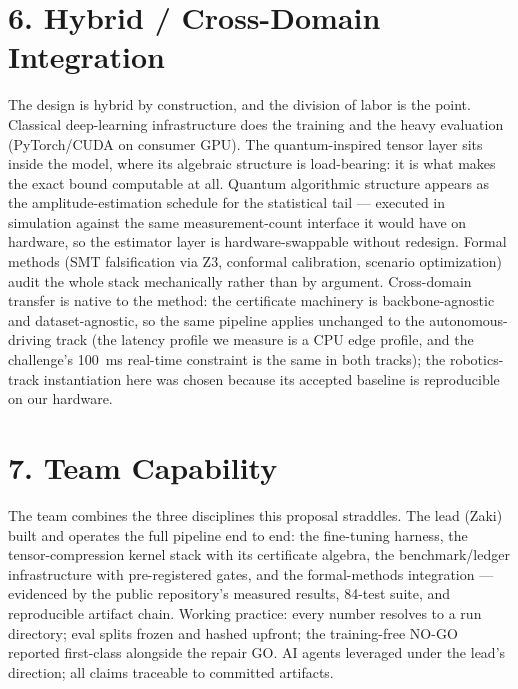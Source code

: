 \documentclass[10pt]{article}
\begin{document}
\section*{6. Hybrid / Cross-Domain Integration}
The design is hybrid by construction, and the division of labor is the point.
Classical deep-learning infrastructure does the training and the heavy
evaluation (PyTorch/CUDA on consumer GPU). The quantum-inspired tensor layer
sits inside the model, where its algebraic structure is load-bearing: it is
what makes the exact bound computable at all. Quantum algorithmic structure
appears as the amplitude-estimation schedule for the statistical tail ---
executed in simulation against the same measurement-count interface it would
have on hardware, so the estimator layer is hardware-swappable without
redesign. Formal methods (SMT falsification via Z3, conformal calibration,
scenario optimization) audit the whole stack mechanically rather than by
argument. Cross-domain transfer is native to the method: the certificate
machinery is backbone-agnostic and dataset-agnostic, so the same pipeline
applies unchanged to the autonomous-driving track (the latency profile we
measure is a CPU edge profile, and the challenge's 100~ms real-time constraint
is the same in both tracks); the robotics-track instantiation here was chosen
because its accepted baseline is reproducible on our hardware.

\section*{7. Team Capability}
The team combines the three disciplines this proposal straddles.
The lead (Zaki) built and operates the full pipeline end to end: the
fine-tuning harness, the tensor-compression kernel stack with its certificate
algebra, the benchmark/ledger infrastructure with pre-registered gates, and
the formal-methods integration --- evidenced by the public repository's
measured results, 84-test suite, and reproducible artifact chain. Working
practice: every number resolves to a run directory; eval splits frozen and
hashed upfront; the training-free NO-GO reported first-class alongside the
repair GO. AI agents leveraged under the lead's direction; all claims
traceable to committed artifacts.

\end{document}
